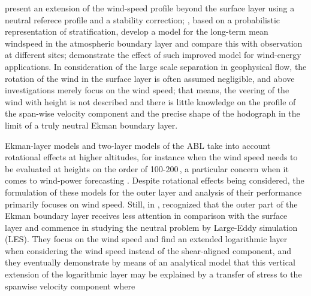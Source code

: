 \documentclass[a4paper,11pt]{amsart}
\begin{document}
\citet{gryning:BM2007} present an extension of the wind-speed profile beyond the surface layer
using a neutral referece profile and a stability correction;
\cite{kelly:BM2010}, based on a probabilistic representation of stratification,
develop a model for the long-term mean windspeed
in the atmospheric boundary layer and compare this with observation at different sites; 
\cite{kelly:WE2016} demonstrate the effect of such improved model for wind-energy applications.
%
In consideration of the large scale separation in geophysical flow, the rotation of the wind in the
surface layer is often assumed negligible, and above investigations merely focus on the wind speed; 
that means, the veering of the wind with height is not described and there is little knowledge on the
profile of the span-wise velocity component and the precise shape of the hodograph in the limit of a
truly neutral Ekman boundary layer.
%
%
\par %
%
Ekman-layer models and two-layer models of the ABL take into account rotational effects at higher altitudes,
for instance when the wind speed needs to be evaluated at heights on the order of 100-200\,,
a particular concern when it comes to wind-power forecasting \citep{optis:BM2014}.
%
Despite rotational effects being considered, the formulation of these models for the outer layer
and analysis of their performance primarily focuses on wind speed.
% 
Still, in \citeyear{jiang:JAS2018}, \citeauthor{jiang:JAS2018}
recognized that the outer part of the Ekman boundary layer receives less attention in comparison
with the surface layer and commence in studying the neutral problem by Large-Eddy simulation (LES).
%
They focus on the wind speed and find an extended logarithmic layer when considering the wind speed instead of
the shear-aligned component, and they eventually demonstrate by means of an analytical model that this vertical
extension of the logarithmic layer may be explained by a transfer of stress to the spanwise velocity component where
\end{document}
